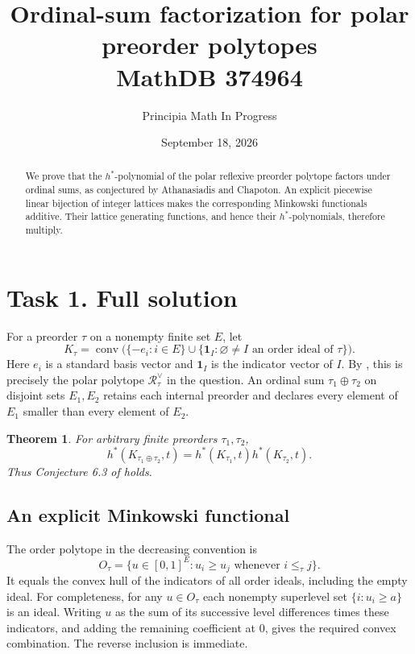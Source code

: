 \documentclass[11pt]{article}
\title{Ordinal-sum factorization for polar preorder polytopes\\\large MathDB 374964}
\author{Principia Math In Progress}
\date{September 18, 2026}
\newtheorem{theorem}{Theorem}
\newcommand{\one}{\mathbf1}
\begin{document}
\maketitle
\begin{abstract}
We prove that the $h^*$-polynomial of the polar reflexive preorder
polytope factors under ordinal sums, as conjectured by Athanasiadis
and Chapoton. An explicit piecewise linear bijection of integer
lattices makes the corresponding Minkowski functionals additive.
Their lattice generating functions, and hence their $h^*$-polynomials,
therefore multiply.
\end{abstract}

\section*{Task 1. Full solution}
For a preorder $\tau$ on a nonempty finite set $E$, let
\begin{equation}\label{eq:K}
 K_\tau=\operatorname{conv}\bigl(\{-e_i:i\in E\}
       \cup\{\one_I:\varnothing\ne I\text{ an order ideal of }\tau\}\bigr).
\end{equation}
Here $e_i$ is a standard basis vector and $\one_I$ is the
indicator vector of $I$. By \cite[Section 6]{AC}, this is precisely
the polar polytope $\mathcal R_\tau^\vee$ in the question.
An ordinal sum $\tau_1\oplus\tau_2$ on disjoint sets $E_1,E_2$
retains each internal preorder and declares every element of $E_1$
smaller than every element of $E_2$.

\begin{theorem}\label{thm:main}
For arbitrary finite preorders $\tau_1,\tau_2$,
\[
 \boxed{h^*(K_{\tau_1\oplus\tau_2},t)
       =h^*(K_{\tau_1},t)h^*(K_{\tau_2},t).}
\]
Thus Conjecture 6.3 of \cite{AC} holds.
\end{theorem}

\subsection*{An explicit Minkowski functional}
The order polytope in the decreasing convention is
\[
 O_\tau=\{u\in[0,1]^E:u_i\ge u_j\text{ whenever }i\le_\tau j\}.
\]
It equals the convex hull of the indicators of all order ideals,
including the empty ideal. For completeness, for any $u\in O_\tau$
each nonempty superlevel set $\{i:u_i\ge a\}$ is an ideal.
Writing $u$ as the sum of its successive level differences times
these indicators, and adding the remaining coefficient at $0$,
gives the required convex combination. The reverse inclusion is immediate.
\end{document}
